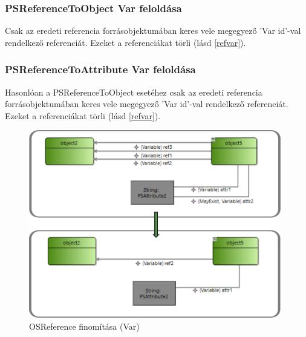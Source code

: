 \subsubsection{PSReferenceToObject Var feloldása}
Csak az eredeti referencia forrásobjektumában keres vele megegyező 'Var id'-val rendelkező referenciát. Ezeket a referenciákat törli (lásd \autoref{refvar}).


\subsubsection{PSReferenceToAttribute Var feloldása}
Hasonlóan a PSReferenceToObject esetéhez csak az eredeti referencia forrásobjektumában keres vele megegyező 'Var id'-val rendelkező referenciát. Ezeket a referenciákat törli (lásd \autoref{refvar}).

\begin{figure}[!ht]
	\centering
	\includegraphics[width=110mm]{figures/refvar.pdf}
	\caption{OSReference finomítása (Var)}
	\label{refvar} 
\end{figure}